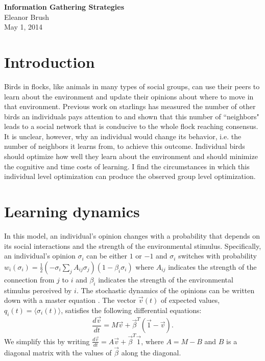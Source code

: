 \documentclass{article}
\begin{document}
\begin{center}
{\bf \LARGE{Information Gathering Strategies}}
\vspace{10pt}
\\ Eleanor Brush
\\ May 1, 2014
\end{center}

\tableofcontents

\section{Introduction}
Birds in flocks, like animals in many types of social groups, can use their peers to learn about the environment and update their opinions about where to move in that environment.  Previous work on starlings has measured the number of other birds an individuals pays attention to and shown that this number of ``neighbors" leads to a social network that is conducive to the whole flock reaching consensus.  It is unclear, however, why an individual would change its behavior, i.e. the number of neighbors it learns from, to achieve this outcome.  Individual birds should optimize how well they learn about the environment and should minimize the cognitive and time costs of learning.  I find the circumstances in which this individual level optimization can produce the observed group level optimization.

\section{Learning dynamics}
In this model, an individual's opinion changes with a probability that depends on its social interactions and the strength of the environmental stimulus. Specifically, an individual's opinion $\sigma_i$ can be either $1$ or $-1$ and $\sigma_i$ switches with probability $w_i(\sigma_i)=\frac{1}{2}(-\sigma_i\sum_jA_{ij}\sigma_j )(1-\beta_i\sigma_i)$ where $A_{ij}$ indicates the strength of the connection from $j$ to $i$ and $\beta_i$ indicates the strength of the environmental stimulus perceived by $i$.  The stochastic dynamics of the opinions can be written down with a master equation \cite{Glauber:1963fk}.  The vector $\vec{v}(t)$ of expected values, $q_i(t)=\langle \sigma_i(t)\rangle$, satisfies the following differential equations: \cite{Glauber:1963fk}
\begin{equation*}
\frac{d\vec{v}}{dt}=M\vec{v}+\vec{\beta}^T(\vec{1}-\vec{v}).
\end{equation*}
We simplify this by writing $\frac{d\vec{v}}{dt}=A\vec{v}+\vec{\beta}^T\vec{1}$, where $A=M-B$ and $B$ is a diagonal matrix with the values of $\vec{\beta}$ along the diagonal.
\end{document}
